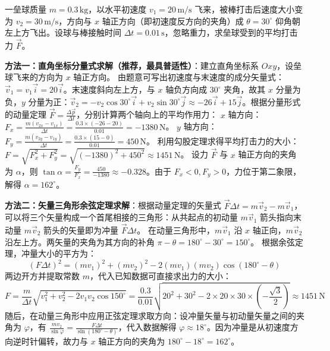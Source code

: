 \begin{example}
一垒球质量 $m = 0.3\,\mathrm{kg}$，以水平初速度 $v_1 = 20\,\mathrm{m/s}$ 飞来，被棒打击后速度大小变为 $v_2 = 30\,\mathrm{m/s}$，方向与 $x$ 轴正方向（即初速度反方向的夹角）成 $\theta = 30^\circ$ 仰角朝左上方飞出。设球与棒接触时间 $\Delta t = 0.01\,\mathrm{s}$，忽略重力，求垒球受到的平均打击力 $\vec{F}$。
\end{example}
\begin{solution}
\textbf{方法一：直角坐标分量式求解（推荐，最具普适性）}：建立直角坐标系 $Oxy$，设垒球飞来的方向为 $x$ 轴正方向。
由题意可写出初速度与末速度的成分矢量式：$\vec{v}_1 = v_1\vec{i} = 20\vec{i}$。末速度斜向左上方，与 $x$ 轴负方向成 $30^\circ$ 夹角，故其 $x$ 分量为负，$y$ 分量为正：$\vec{v}_2 = -v_2\cos 30^\circ\vec{i} + v_2\sin 30^\circ\vec{j} \approx -26\vec{i} + 15\vec{j}$。根据分量形式的动量定理 $\vec{F} = \frac{\Delta\vec{p}}{\Delta t}$，分别计算两个轴向上的平均作用力：
$x$ 轴方向：$F_x = \frac{m(v_{2x} - v_{1x})}{\Delta t} = \frac{0.3 \times (-26 - 20)}{0.01} = -1380\,\mathrm{N}$。
$y$ 轴方向：$F_y = \frac{m(v_{2y} - v_{1y})}{\Delta t} = \frac{0.3 \times (15 - 0)}{0.01} = 450\,\mathrm{N}$。
利用勾股定理求得平均打击力的大小：
$F = \sqrt{F_x^2 + F_y^2} = \sqrt{(-1380)^2 + 450^2} \approx 1451\,\mathrm{N}$。
设力 $\vec{F}$ 与 $x$ 轴正方向的夹角为 $\alpha$，则 $\tan\alpha = \frac{F_y}{F_x} = \frac{450}{-1380} \approx -0.328$。由于 $F_x < 0, F_y > 0$，力位于第二象限，解得 $\alpha = 162^\circ$。

\textbf{方法二：矢量三角形余弦定理求解}：根据动量定理的矢量式 $\vec{F}\Delta t = m\vec{v}_2 - m\vec{v}_1$，可以将三个矢量构成一个首尾相接的三角形：从共起点的初动量 $m\vec{v}_1$ 箭头指向末动量 $m\vec{v}_2$ 箭头的矢量即为冲量 $\vec{F}\Delta t$。
在动量三角形中，$m\vec{v}_1$ 沿 $x$ 轴正向，$m\vec{v}_2$ 沿左上方。两矢量的夹角为其方向的补角 $\pi - \theta = 180^\circ - 30^\circ = 150^\circ$。
根据余弦定理，冲量大小的平方为：
\[(F\Delta t)^2 = (mv_1)^2 + (mv_2)^2 - 2(mv_1)(mv_2)\cos(180^\circ - \theta)\]
两边开方并提取常数 $m$，代入已知数据可直接求出力的大小：
\[F = \frac{m}{\Delta t}\sqrt{v_1^2 + v_2^2 - 2v_1v_2\cos 150^\circ} = \frac{0.3}{0.01}\sqrt{20^2 + 30^2 - 2 \times 20 \times 30 \times \left(-\frac{\sqrt{3}}{2}\right)} \approx 1451\,\mathrm{N}\]
随后，在动量三角形中应用正弦定理求取方向：设冲量矢量与初动量矢量之间的夹角为 $\varphi$，有 $\frac{mv_2}{\sin\varphi} = \frac{F\Delta t}{\sin(180^\circ - \theta)}$，代入数据解得 $\varphi \approx 18^\circ$。因为冲量是从初速度方向逆时针偏转，故力与 $x$ 轴正方向的夹角为 $180^\circ - 18^\circ = 162^\circ$。
\end{solution}

